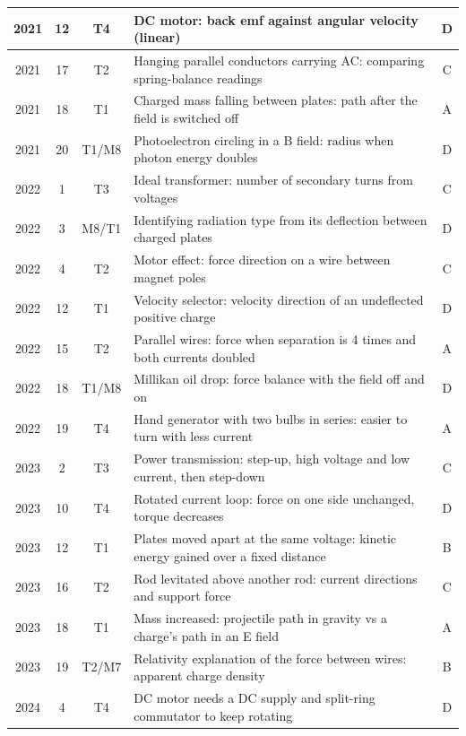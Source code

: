 \documentclass[12pt]{article}
\begin{document}
{\begin{longtable}{|c|c|c|p{108mm}|c|}
    2021 & 12 & T4 & DC motor: back emf against angular velocity (linear) & D\\ \hline
    2021 & 17 & T2 & Hanging parallel conductors carrying AC: comparing spring-balance readings & C\\ \hline
    2021 & 18 & T1 & Charged mass falling between plates: path after the field is switched off & A\\ \hline
    2021 & 20 & T1/\allowbreak M8 & Photoelectron circling in a B field: radius when photon energy doubles & D\\ \hline
    2022 & 1 & T3 & Ideal transformer: number of secondary turns from voltages & C\\ \hline
    2022 & 3 & M8/\allowbreak T1 & Identifying radiation type from its deflection between charged plates & D\\ \hline
    2022 & 4 & T2 & Motor effect: force direction on a wire between magnet poles & C\\ \hline
    2022 & 12 & T1 & Velocity selector: velocity direction of an undeflected positive charge & D\\ \hline
    2022 & 15 & T2 & Parallel wires: force when separation is 4 times and both currents doubled & A\\ \hline
    2022 & 18 & T1/\allowbreak M8 & Millikan oil drop: force balance with the field off and on & D\\ \hline
    2022 & 19 & T4 & Hand generator with two bulbs in series: easier to turn with less current & A\\ \hline
    2023 & 2 & T3 & Power transmission: step-up, high voltage and low current, then step-down & C\\ \hline
    2023 & 10 & T4 & Rotated current loop: force on one side unchanged, torque decreases & D\\ \hline
    2023 & 12 & T1 & Plates moved apart at the same voltage: kinetic energy gained over a fixed distance & B\\ \hline
    2023 & 16 & T2 & Rod levitated above another rod: current directions and support force & C\\ \hline
    2023 & 18 & T1 & Mass increased: projectile path in gravity vs a charge's path in an E field & A\\ \hline
    2023 & 19 & T2/\allowbreak M7 & Relativity explanation of the force between wires: apparent charge density & B\\ \hline
    2024 & 4 & T4 & DC motor needs a DC supply and split-ring commutator to keep rotating & D\\ \hline

\end{longtable}}
\end{document}
